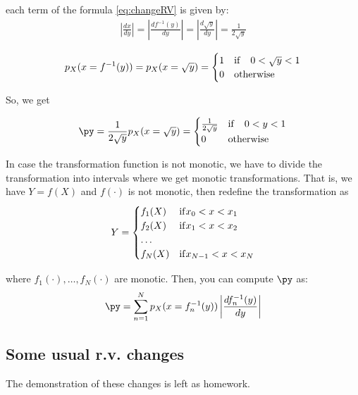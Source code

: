 each term of the formula \eqref{eq:changeRV} is given by:
\begin{eqnarray} 
\left| \frac{dx}{dy}\right| = \left| \frac{df^{-1}(y)}{dy}\right| = \left| \frac{d\sqrt{y}}{dy}\right| = \frac{1}{2\sqrt{y}} \nonumber
\end{eqnarray} 

\begin{eqnarray} 
p_X(x = f^{-1}(y)) = p_X(x = \sqrt{y}) = \begin{cases}
1 & {\rm if} \quad 0<\sqrt{y}<1\\
0 & {\rm otherwise} 
\end{cases}  \nonumber
\end{eqnarray} 

So, we get

\begin{eqnarray} 
\py  = \frac{1}{2\sqrt{y}} p_X(x = \sqrt{y}) = \begin{cases}
\frac{1}{2\sqrt{y}} & {\rm if} \quad 0<y<1\\
0 & {\rm otherwise} 
\end{cases}  \nonumber
\end{eqnarray} 

In case the transformation function is not monotic, we have to divide the transformation into intervals where we get monotic transformations. That is, we have $Y = f(X)$ and $f(\cdot)$ is not monotic, then redefine the transformation as
\begin{eqnarray} 
Y = \begin{cases} 
f_1(X) & {\rm if } x_0 < x <x_1 \\
f_2(X) & {\rm if } x_1 < x <x_2 \\
\ldots  &  \\
f_N(X) & {\rm if } x_{N-1} < x <x_N \\
\end{cases}  \nonumber
\end{eqnarray}

where $f_1(\cdot),\ldots, f_N(\cdot) $ are monotic. Then, you can compute $\py$ as:
\begin{eqnarray} 
\py =  \sum_{n=1}^N p_X(x = f_n^{-1}(y))  \left| \frac{df_n^{-1}(y)}{dy}\right| \nonumber
\end{eqnarray} 

\subsection{Some usual r.v. changes}

The demonstration of these changes is left as homework.

